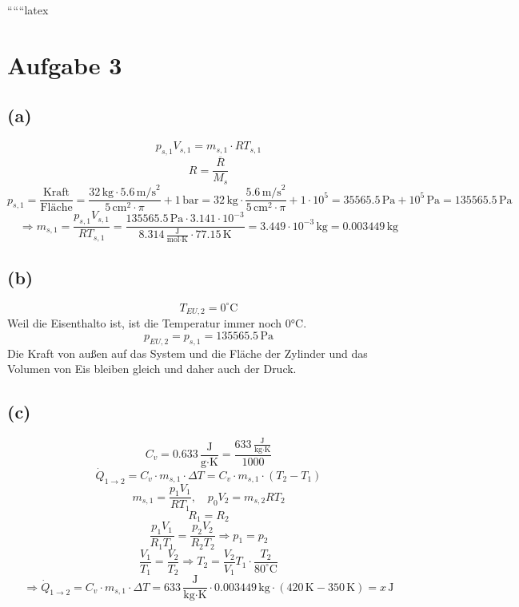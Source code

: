 
``````latex


\section*{Aufgabe 3}

\subsection*{(a)}

\[
p_{s,1} V_{s,1} = m_{s,1} \cdot R T_{s,1}
\]
\[
R = \frac{\overline{R}}{M_s}
\]
\[
p_{s,1} = \frac{\text{Kraft}}{\text{Fläche}} = \frac{32 \, \text{kg} \cdot 5.6 \, \text{m/s}^2}{5 \, \text{cm}^2 \cdot \pi} + 1 \, \text{bar} = 32 \, \text{kg} \cdot \frac{5.6 \, \text{m/s}^2}{5 \, \text{cm}^2 \cdot \pi} + 1 \cdot 10^5 = 35565.5 \, \text{Pa} + 10^5 \, \text{Pa} = 135565.5 \, \text{Pa}
\]
\[
\Rightarrow m_{s,1} = \frac{p_{s,1} V_{s,1}}{R T_{s,1}} = \frac{135565.5 \, \text{Pa} \cdot 3.141 \cdot 10^{-3}}{8.314 \, \frac{\text{J}}{\text{mol} \cdot \text{K}} \cdot 77.15 \, \text{K}} = 3.449 \cdot 10^{-3} \, \text{kg} = 0.003449 \, \text{kg}
\]

\subsection*{(b)}

\[
T_{EU,2} = 0^\circ \text{C}
\]
Weil die Eisenthalto ist, ist die Temperatur immer noch 0°C.
\[
p_{EU,2} = p_{s,1} = 135565.5 \, \text{Pa}
\]
Die Kraft von außen auf das System und die Fläche der Zylinder und das Volumen von Eis bleiben gleich und daher auch der Druck.

\subsection*{(c)}

\[
C_v = 0.633 \, \frac{\text{J}}{\text{g} \cdot \text{K}} = \frac{633 \, \frac{\text{J}}{\text{kg} \cdot \text{K}}}{1000}
\]
\[
\dot{Q}_{1 \rightarrow 2} = C_v \cdot m_{s,1} \cdot \Delta T = C_v \cdot m_{s,1} \cdot (T_2 - T_1)
\]
\[
m_{s,1} = \frac{p_1 V_1}{R T_1}, \quad p_0 V_2 = m_{s,2} R T_2
\]
\[
R_1 = R_2
\]
\[
\frac{p_1 V_1}{R_1 T_1} = \frac{p_2 V_2}{R_2 T_2} \Rightarrow p_1 = p_2
\]
\[
\frac{V_1}{T_1} = \frac{V_2}{T_2} \Rightarrow T_2 = \frac{V_2}{V_1} T_1 \cdot \frac{T_2}{80^\circ \text{C}}
\]
\[
\Rightarrow \dot{Q}_{1 \rightarrow 2} = C_v \cdot m_{s,1} \cdot \Delta T = 633 \, \frac{\text{J}}{\text{kg} \cdot \text{K}} \cdot 0.003449 \, \text{kg} \cdot (420 \, \text{K} - 350 \, \text{K}) = x \, \text{J}
\]

